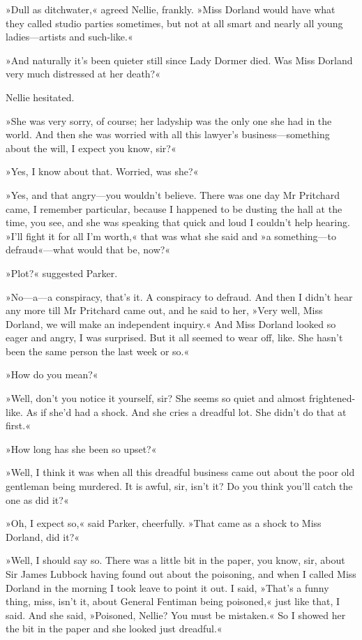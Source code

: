 »Dull as ditchwater,« agreed Nellie, frankly. »Miss Dorland would have what they called studio parties sometimes, but not at all smart and nearly all young ladies—artists and such-like.«

»And naturally it's been quieter still since Lady Dormer died. Was Miss Dorland very much distressed at her death?«

Nellie hesitated.

»She was very sorry, of course; her ladyship was the only one she had in the world. And then she was worried with all this lawyer's business—something about the will, I expect you know, sir?«

»Yes, I know about that. Worried, was she?«

»Yes, and that angry—you wouldn't believe. There was one day Mr Pritchard came, I remember particular, because I happened to be dusting the hall at the time, you see, and she was speaking that quick and loud I couldn't help hearing. »I'll fight it for all I'm worth,« that was what she said and »a \textellipsis  something—to defraud«—what would that be, now?«

»Plot?« suggested Parker.

»No—a—a conspiracy, that's it. A conspiracy to defraud. And then I didn't hear any more till Mr Pritchard came out, and he said to her, »Very well, Miss Dorland, we will make an independent inquiry.« And Miss Dorland looked so eager and angry, I was surprised. But it all seemed to wear off, like. She hasn't been the same person the last week or so.«

»How do you mean?«

»Well, don't you notice it yourself, sir? She seems so quiet and almost frightened-like. As if she'd had a shock. And she cries a dreadful lot. She didn't do that at first.«

»How long has she been so upset?«

»Well, I think it was when all this dreadful business came out about the poor old gentleman being murdered. It is awful, sir, isn't it? Do you think you'll catch the one as did it?«

»Oh, I expect so,« said Parker, cheerfully. »That came as a shock to Miss Dorland, did it?«

»Well, I should say so. There was a little bit in the paper, you know, sir, about Sir James Lubbock having found out about the poisoning, and when I called Miss Dorland in the morning I took leave to point it out. I said, »That's a funny thing, miss, isn't it, about General Fentiman being poisoned,« just like that, I said. And she said, »Poisoned, Nellie? You must be mistaken.« So I showed her the bit in the paper and she looked just dreadful.«

